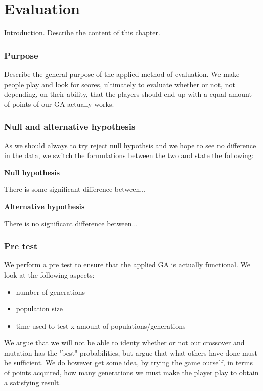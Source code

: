 \section{Evaluation} \label{sec:evaluation}

Introduction. Describe the content of this chapter.

\subsubsection{Purpose}
Describe the general purpose of the applied method of evaluation. We make people play and look for scores, ultimately to evaluate whether or not, not depending, on their ability, that the players should end up with a equal amount of points of our GA actually works.

\subsubsection{Null and alternative hypothesis}


As we should always to try reject null hypothsis and we hope to see no difference in the data, we switch the formulations between the two and state the following:


\textbf{Null hypothesis}


There is some significant difference between...


\textbf{Alternative hypothesis}


There is no significant difference between...


\subsubsection{Pre test}

We perform a pre test to ensure that the applied GA is actually functional. We look at the following aspects:

\begin{itemize}
\item number of generations
\item population size
\item time used to test x amount of populations/generations
\end{itemize}

We argue that we will not be able to identy whether or not our crossover and mutation has the "best" probabilities, but argue that what others have done must be sufficient. We do however get some idea, by trying the game ourself, in terms of points acquired, how many generations we must make the player play to obtain a satisfying result.


